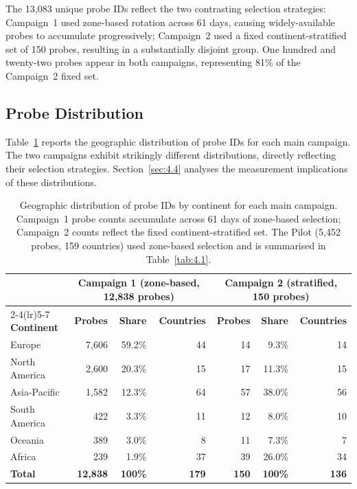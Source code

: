 The 13,083 unique probe IDs reflect the two contrasting selection strategies: Campaign~1 used zone-based rotation across 61 days, causing widely-available probes to accumulate progressively; Campaign~2 used a fixed continent-stratified set of 150 probes, resulting in a substantially disjoint group. One hundred and twenty-two probes appear in both campaigns, representing 81\% of the Campaign~2 fixed set.

\subsection{Probe Distribution}
\label{subsec:4.1.2}

Table~\ref{tab:4.2} reports the geographic distribution of probe IDs for each main campaign. The two campaigns exhibit strikingly different distributions, directly reflecting their selection strategies. Section~\ref{sec:4.4} analyses the measurement implications of these distributions.

\begin{table}[H]
\centering
\small
\begin{tabular}{l r r r r r r}
\toprule
& \multicolumn{3}{c}{\textbf{Campaign 1} (zone-based, 12,838 probes)}
& \multicolumn{3}{c}{\textbf{Campaign 2} (stratified, 150 probes)} \\
\cmidrule(lr){2-4}\cmidrule(lr){5-7}
\textbf{Continent} & \textbf{Probes} & \textbf{Share} & \textbf{Countries}
                   & \textbf{Probes} & \textbf{Share} & \textbf{Countries} \\
\midrule
Europe          & 7,606 & 59.2\% & 44 &  14 &  9.3\% & 14 \\
North America   & 2,600 & 20.3\% & 15 &  17 & 11.3\% & 15 \\
Asia-Pacific    & 1,582 & 12.3\% & 64 &  57 & 38.0\% & 56 \\
South America   &   422 &  3.3\% & 11 &  12 &  8.0\% & 10 \\
Oceania         &   389 &  3.0\% &  8 &  11 &  7.3\% &  7 \\
Africa          &   239 &  1.9\% & 37 &  39 & 26.0\% & 34 \\
\midrule
\textbf{Total}  & \textbf{12,838} & \textbf{100\%} & \textbf{179}
                & \textbf{150}    & \textbf{100\%} & \textbf{136} \\
\bottomrule
\end{tabular}
\caption{Geographic distribution of probe IDs by continent for each main campaign. Campaign~1 probe counts accumulate across 61 days of zone-based selection; Campaign~2 counts reflect the fixed continent-stratified set. The Pilot (5,452 probes, 159 countries) used zone-based selection and is summarised in Table~\ref{tab:4.1}.}
\label{tab:4.2}
\end{table}

